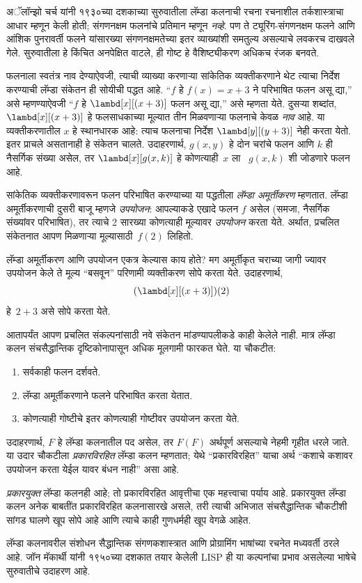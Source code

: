 \documentclass[../../../include/open-logic-section]{subfiles}
\begin{document}

अॅलॉन्झो चर्च यांनी १९३०च्या दशकाच्या सुरुवातीला लॅम्डा कलनाची रचना
रचनाशील तर्कशास्त्राचा आधार म्हणून केली होती; संगणनक्षम फलनांचे
प्रतिमान म्हणून \emph{नव्हे}. पण ते ट्यूरिंग-संगणनक्षम फलने आणि आंशिक
पुनरावर्ती फलने यांसारख्या संगणनक्षमतेच्या इतर व्याख्यांशी समतुल्य
असल्याचे लवकरच दाखवले गेले. सुरुवातीला हे किंचित अनपेक्षित वाटले,
ही गोष्ट हे वैशिष्ट्यीकरण अधिकच रंजक बनवते.

फलनाला स्वतंत्र नाव देण्याऐवजी, त्याची व्याख्या करणाऱ्या सांकेतिक
व्यक्तीकरणाने थेट त्याचा निर्देश करण्याची लॅम्डा संकेतन ही सोयीची
पद्धत आहे. “$f$ हे $f(x) = x + 3$ ने परिभाषित फलन असू द्या,” असे
म्हणण्याऐवजी “$f$ हे $\lambd[x][(x + 3)]$ फलन असू द्या,” असे म्हणता
येते. दुसऱ्या शब्दांत, $\lambd[x][(x+3)]$ हे फलसाधकाच्या मूल्यात तीन मिळवणाऱ्या
फलनाचे केवळ \emph{नाव} आहे. या व्यक्तीकरणातील $x$ हे स्थानधारक आहे: त्याच फलनाचा निर्देश
$\lambd[y][(y + 3)]$ नेही करता येतो. इतर प्राचले असतानाही हे संकेतन
चालते. उदाहरणार्थ, $g(x, y)$ हे दोन चरांचे फलन आणि $k$ ही नैसर्गिक
संख्या असेल, तर $\lambd[x][g(x,k)]$ हे कोणत्याही~$x$ ला
~$g(x, k)$ शी जोडणारे फलन आहे.

सांकेतिक व्यक्तीकरणावरून फलन परिभाषित करण्याच्या या पद्धतीला
\emph{लॅम्डा अमूर्तीकरण} म्हणतात. लॅम्डा अमूर्तीकरणाची दुसरी बाजू
म्हणजे \emph{उपयोजन}: आपल्याकडे एखादे फलन $f$ असेल (समजा, नैसर्गिक
संख्यांवर परिभाषित), तर त्याचे 2 सारख्या कोणत्याही मूल्यावर
\emph{उपयोजन} करता येते. अर्थात, प्रचलित संकेतनात आपण मिळणाऱ्या
मूल्यासाठी~$f(2)$ लिहितो.

लॅम्डा अमूर्तीकरण आणि उपयोजन एकत्र केल्यास काय होते? मग अमूर्तीकृत
चराच्या जागी ज्यावर उपयोजन केले ते मूल्य “बसवून” परिणामी
व्यक्तीकरण सोपे करता येते. उदाहरणार्थ,
\[
(\lambd[x][(x + 3)])(2)
\]
हे~$2 + 3$ असे सोपे करता येते.

आतापर्यंत आपण प्रचलित संकल्पनांसाठी नवे संकेतन मांडण्यापलीकडे काही
केलेले नाही. मात्र लॅम्डा कलन संचसैद्धान्तिक दृष्टिकोनापासून अधिक
मूलगामी फारकत घेते. या चौकटीत:
\begin{enumerate}
\item सर्वकाही फलन दर्शवते.
\item लॅम्डा अमूर्तीकरणाने फलने परिभाषित करता येतात.
\item कोणत्याही गोष्टीचे इतर कोणत्याही गोष्टीवर उपयोजन करता येते.
\end{enumerate}
उदाहरणार्थ, $F$ हे लॅम्डा कलनातील पद असेल, तर $F(F)$ अर्थपूर्ण
असल्याचे नेहमी गृहीत धरले जाते. या उदार चौकटीला
\emph{प्रकारविरहित} लॅम्डा कलन म्हणतात; येथे “प्रकारविरहित” याचा अर्थ
“कशाचे कशावर उपयोजन करता येईल यावर बंधन नाही” असा आहे.

\begin{digress}
\emph{प्रकारयुक्त} लॅम्डा कलनही आहे; तो प्रकारविरहित आवृत्तीचा
एक महत्त्वाचा पर्याय आहे. प्रकारयुक्त लॅम्डा कलन अनेक बाबतींत
प्रकारविरहित कलनासारखे असले, तरी त्याची अभिजात संचसैद्धान्तिक
चौकटीशी सांगड घालणे खूप सोपे आहे आणि त्याचे काही गुणधर्मही
खूप वेगळे आहेत.

लॅम्डा कलनावरील संशोधन सैद्धान्तिक संगणकशास्त्रात आणि
प्रोग्रामिंग भाषांच्या रचनेत मध्यवर्ती ठरले आहे. जॉन मॅकार्थी
यांनी १९५०च्या दशकात तयार केलेली LISP ही या कल्पनांचा
प्रभाव असलेल्या भाषेचे सुरुवातीचे उदाहरण आहे.
\end{digress}
\end{document}
